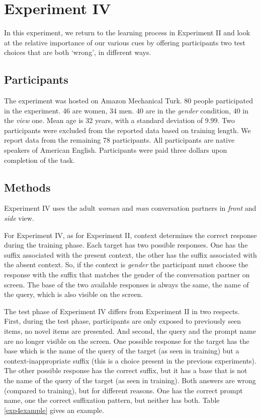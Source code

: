 \documentclass{frontiersSCNS} %
\begin{document}
\section{Experiment IV}


In this experiment, we return to the learning process in Experiment II and look at the relative importance of our various cues by offering participants two test choices that are both `wrong', in different ways.


\subsection{Participants}

The experiment was hosted on Amazon Mechanical Turk. 80 people participated in the experiment. 46 are women, 34 men. 40 are in the \emph{gender} condition, 40 in the \emph{view} one. Mean age is 32 years, with a standard deviation of 9.99. Two participants were excluded from the reported data based on training length. We report data from the remaining 78 participants. All participants are native speakers of American English. Participants were paid three dollars upon completion of the task.

\subsection{Methods}

Experiment IV uses the adult {\it woman} and {\it man} conversation partners in {\it front} and {\it side} view.

For Experiment IV, as for Experiment II, context determines the correct response during the training phase. Each target has two possible responses. One has the suffix associated with the present context, the other has the suffix associated with the absent
context. So, if the context is \emph{gender} the participant must choose the response with the suffix that matches the gender of the
conversation partner on screen. The base of the two available responses is always the same, the name of the query, which is also visible on the
screen.

The test phase of Experiment IV differs from Experiment II in two respects. First, during the test phase, participants are only exposed to  previously seen items, no novel items are presented. 
And second, the query and the prompt name are no longer visible on the screen. One possible response for the target has the base which is the name of the query of the target (as seen in training) but a context-inappropriate suffix (this is a choice present in the previous experiments). The other possible response has the correct suffix, but it has a base that is not the name of the query of the target (as seen in training). Both answers are wrong (compared to training), but for different reasons. One has the correct prompt name, one the correct suffixation pattern, but neither has both. Table \ref{exp4example} gives an example.
\end{document}
